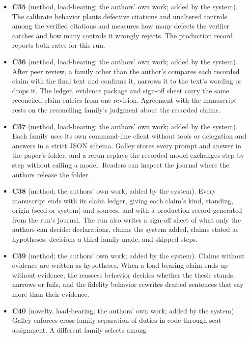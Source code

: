 \documentclass[
]{article}
\begin{document}
\begin{itemize}
  audited full-text passages. Galley takes the bibliographic record for
  a cited work with a DOI from the DOI registry.
\item
  \textbf{C35} (method, load-bearing; the authors' own work; added by
  the system). The calibrate behavior plants defective citations and
  unaltered controls among the verified citations and measures how many
  defects the verifier catches and how many controls it wrongly rejects.
  The production record reports both rates for this run.
\item
  \textbf{C36} (method, load-bearing; the authors' own work; added by
  the system). After peer review, a family other than the author's
  compares each recorded claim with the final text and confirms it,
  narrows it to the text's wording or drops it. The ledger, evidence
  package and sign-off sheet carry the same reconciled claim entries
  from one revision. Agreement with the manuscript rests on the
  reconciling family's judgment about the recorded claims.
\item
  \textbf{C37} (method, load-bearing; the authors' own work; added by
  the system). Each family uses its own command-line client without
  tools or delegation and answers in a strict JSON schema. Galley stores
  every prompt and answer in the paper's folder, and a rerun replays the
  recorded model exchanges step by step without calling a model. Readers
  can inspect the journal where the authors release the folder.
\item
  \textbf{C38} (method; the authors' own work; added by the system).
  Every manuscript ends with its claim ledger, giving each claim's kind,
  standing, origin (seed or system) and sources, and with a production
  record generated from the run's journal. The run also writes a
  sign-off sheet of what only the authors can decide: declarations,
  claims the system added, claims stated as hypotheses, decisions a
  third family made, and skipped steps.
\item
  \textbf{C39} (method; the authors' own work; added by the system).
  Claims without evidence are written as hypotheses. When a load-bearing
  claim ends up without evidence, the reassess behavior decides whether
  the thesis stands, narrows or fails, and the fidelity behavior
  rewrites drafted sentences that say more than their evidence.
\item
  \textbf{C40} (novelty, load-bearing; the authors' own work; added by
  the system). Galley enforces cross-family separation of duties in code
  through seat assignment. A different family selects among

\end{itemize}
\end{document}
